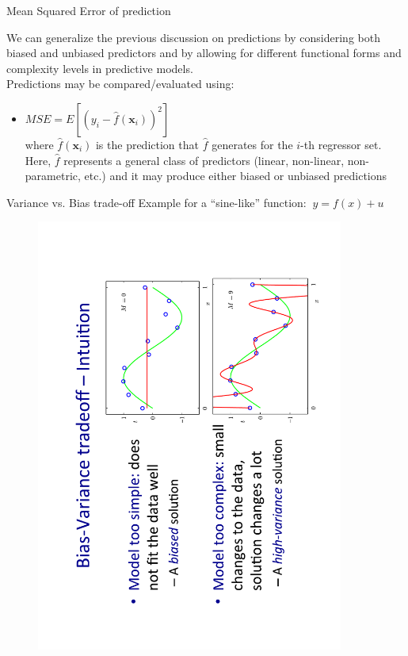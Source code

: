 \documentclass{beamer}
\begin{document}
\begin{frame}{Mean Squared Error of prediction}

We can generalize the previous discussion on predictions by considering both biased and unbiased predictors and by allowing for different functional forms and complexity levels in predictive models. \\ \bigskip 
Predictions may be compared/evaluated using:

\medskip
\begin{itemize}
   \item $\textit{MSE} = E
   \left[ \left( y_i - \hat{f}(\bm{x}_i) \right)^2 \right]$\\
   \smallskip
   where $\hat{f}(\bm{x}_i)$ is the prediction that $\hat{f}$ generates for the $i$-th regressor set. Here, $\hat{f}$ represents a general class of predictors (linear, non-linear, non-parametric, etc.) and it may produce either biased or unbiased predictions
\end{itemize}
\end{frame}
\begin{frame}{Variance vs. Bias trade-off}
Example for a ``sine-like'' function: $~y = f(x) + u$
\vspace{-1cm}
\begin{figure}
\includegraphics[angle=270,trim = 0cm 1cm 0cm 0cm, clip,width=0.9\textwidth]{img/VarBias.pdf}
\end{figure}
\end{frame}
\end{document}
